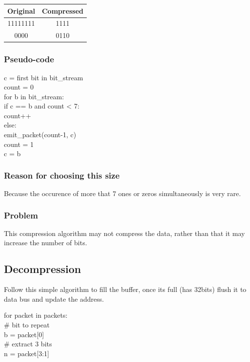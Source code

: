 \documentclass[12pt]{extarticle}
\begin{document}
\begin{center}
 \begin{tabular}{||c c||} 
 \hline
 Original & Compressed \\ [0.5ex] 
 \hline\hline
  11111111 & 1111 \\ 
 \hline
 0000  & 0110 \\ [1ex] 
 \hline
\end{tabular}
\end{center}

\subsubsection{Pseudo-code}
c = first bit in bit\_stream \\
count = 0 \\
for b in bit\_stream: \\
    if c == b and count < 7: \\
        count++ \\
    else: \\
        emit\_packet(count-1, c) \\
        count = 1 \\
        c = b \\

\subsubsection{Reason for choosing this size}
Because the occurence of more that 7 ones or zeros simultaneously is very rare.

\subsubsection{Problem}
This compression algorithm may not compress the data, rather than that it may increase the number of bits.

\subsection{Decompression}
Follow this simple algorithm to fill the buffer, once its full (has 32bits) flush it to data bus and update the address.

for packet in packets: \\
    \# bit to repeat \\
    b = packet[0] \\

    \# extract 3 bits \\
    n = packet[3:1] \\
\end{document}
